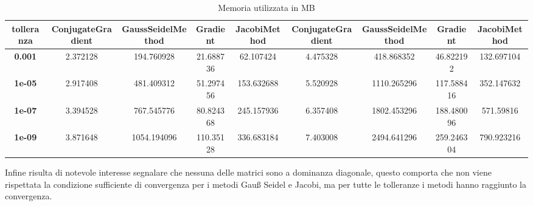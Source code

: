 \begin{table}[!ht]
\begin{subtable}[!ht]{1\textwidth}
{\begin{tabular}{@{}ccccc|cccc@{}}
                \textbf{tolleranza} & \textbf{ConjugateGradient}         & \textbf{GaussSeidelMethod}        & \textbf{Gradient} & \textbf{JacobiMethod} & \textbf{ConjugateGradient} & \textbf{GaussSeidelMethod} & \textbf{Gradient} & \textbf{JacobiMethod} \\ \midrule
                \textbf{0.001}      & 2.372128                           & 194.760928                        & 21.688736         & 62.107424             & 4.475328                   & 418.868352                 & 46.822192         & 132.697104            \\
                \textbf{1e-05}      & 2.917408                           & 481.409312                        & 51.297456         & 153.632688            & 5.520928                   & 1110.265296                & 117.588416        & 352.147632            \\
                \textbf{1e-07}      & 3.394528                           & 767.545776                        & 80.824368         & 245.157936            & 6.357408                   & 1802.453296                & 188.480096        & 571.59816             \\
                \textbf{1e-09}      & 3.871648                           & 1054.194096                       & 110.35128         & 336.683184            & 7.403008                   & 2494.641296                & 259.246304        & 790.923216            \\ \bottomrule
            \end{tabular}
        }
        \caption{Vem 1 e Vem 2}
        \label{tab:vem_mem}
    \end{subtable}
    \caption{Memoria utilizzata in MB}
    \label{tab:memory}
\end{table}

Infine risulta di notevole interesse segnalare che nessuna delle matrici sono a
dominanza diagonale, questo comporta che non viene rispettata la condizione sufficiente
di convergenza per i metodi Gauß Seidel e Jacobi, ma per tutte le tolleranze i metodi
hanno raggiunto la convergenza.

